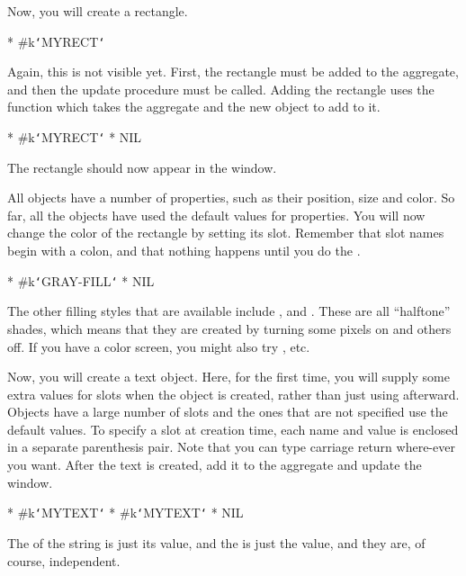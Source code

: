 Now, you will create a rectangle.
\begin{programexample}
* 
\#k{\tt\char`\<}MYRECT{\tt\char`\>}
\end{programexample}

Again, this is not visible yet.  First, the rectangle must be added to the
aggregate, and then the update procedure must be called.  Adding the
rectangle uses the function
 which takes the aggregate and the new object to add to
it.
\begin{programexample}
* 
\#k{\tt\char`\<}MYRECT{\tt\char`\>}
* 
NIL
\end{programexample}

The rectangle should now appear in the window.

All objects have a number of properties,
such as their position, size and color.  So far, all the objects have used
the default values for properties.  You will now change the color of the
rectangle by setting its  slot.  Remember that slot
names begin with a colon, and that nothing happens until you do the
.
\begin{programexample}
* 
\#k{\tt\char`\<}GRAY-FILL{\tt\char`\>}
* 
NIL
\end{programexample}

The other filling styles that are available include , and
.  These are all ``halftone'' shades, which
means that they are created by turning some pixels on and others off.
If you have a color screen, you might also try , etc.

Now, you will create a text object.  Here, for the first time, you will
supply some extra values for slots when the object is created, rather than
just using  afterward.  Objects have a large number of slots
and the ones that are not specified use the default values.
To specify a slot at creation time, each name and value is
enclosed in a separate parenthesis pair.  Note that you can type carriage
return where-ever you want.  After the text is created, add it to the
aggregate and update the window.
\begin{programexample}
* 
\#k{\tt\char`\<}MYTEXT{\tt\char`\>}
* 
\#k{\tt\char`\<}MYTEXT{\tt\char`\>}
* 
NIL
\end{programexample}
The  of the string is just its  value, and the  is
just the  value, and they are, of course, independent.

